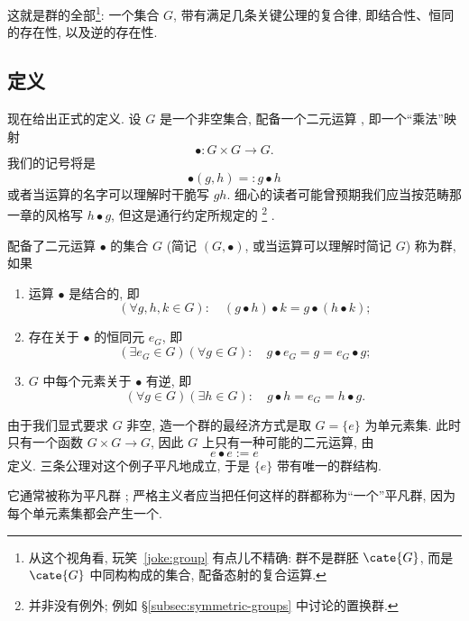 这就是群的全部\footnote{从这个视角看, 玩笑~\ref{joke:group} 有点儿不精确: 群不是群胚 $\cate{G}$, 而是 $\cate{G}$ 中同构构成的集合, 配备态射的复合运算.}: 一个集合 $G$, 带有满足几条关键公理的复合律, 即结合性、恒同的存在性, 以及逆的存在性.

\subsection{定义}
\label{subsec:def-group-official}

现在给出正式的定义. 设 $G$ 是一个非空集合, 配备一个二元运算%
, 即一个``乘法''映射
\[
\bullet : G \times G \rightarrow G.
\]
我们的记号将是
\[
\bullet(g, h) =: g \bullet h
\]
或者当运算的名字可以理解时干脆写 $gh$. 细心的读者可能曾预期我们应当按范畴那一章的风格写 $h \bullet g$, 但这是通行约定所规定的%
\footnote{并非没有例外; 例如 \S\ref{subsec:symmetric-groups} 中讨论的置换群.}%
.

\begin{definition}
\label{def:group}
配备了二元运算 $\bullet$ 的集合 $G$ (简记 $(G, \bullet)$, 或当运算可以理解时简记 $G$) 称为群, 如果
\begin{enumerate}[label=(\roman*)]
	\item 运算 $\bullet$ 是结合的, 即
	\[
	(\forall g, h, k \in G): \quad (g \bullet h) \bullet k = g \bullet (h \bullet k);
	\]
	\item 存在关于 $\bullet$ 的恒同元%
	$e_G$, 即
	\[
	(\exists e_G \in G) (\forall g \in G): \quad g \bullet e_G = g = e_G \bullet g;
	\]
	\item $G$ 中每个元素关于 $\bullet$ 有逆, 即
	\[
	(\forall g \in G) (\exists h \in G): \quad g \bullet h = e_G = h \bullet g.
	\]
\end{enumerate}
\end{definition}

\begin{example}
\label{ex:trivial-group}
由于我们显式要求 $G$ 非空, 造一个群的最经济方式是取 $G = \{e\}$ 为单元素集. 此时只有一个函数 $G \times G \to G$, 因此 $G$ 上只有一种可能的二元运算, 由
\[
e \bullet e := e
\]
定义. 三条公理对这个例子平凡地成立, 于是 $\{e\}$ 带有唯一的群结构.

它通常被称为平凡群%
; 严格主义者应当把任何这样的群都称为``一个''平凡群, 因为每个单元素集都会产生一个.
\end{example}

